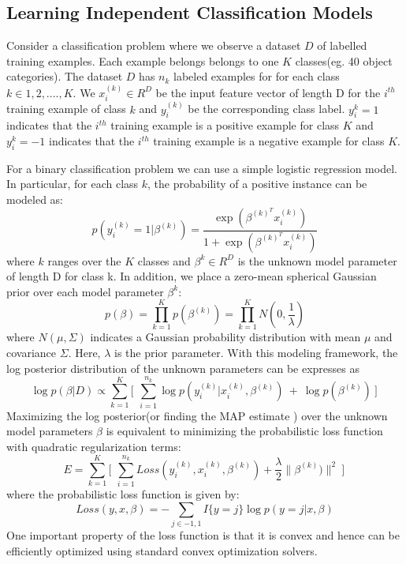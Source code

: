 \documentclass[10pt,twocolumn,letterpaper]{article}
\begin{document}
\subsection{Learning Independent Classification Models}

Consider a classification problem where we observe a dataset $D$ of labelled  training examples. 
Each example belongs belongs to one $K$ classes(eg. 40 object categories). The dataset $D$
has $n_{k}$ labeled examples for for each class $k  \in {1,2,....,K} $. We $x_{i}^{(k)} \in R^{D} $ 
be the input feature vector of length D for the $i^{th}$ training example of class $k$ and 
$y_{i}^{(k)}$ be the corresponding class label. $ y_{i}^{k} = 1 $ indicates that the $i^{th}$ training example 
 is a positive example for class $K$ and  $ y_{i}^{k} = -1 $ indicates that the $i^{th}$ training example 
 is a negative example for class $K$.
 
 For a binary classification problem we can use a simple logistic regression model. In particular, 
 for each class $k$, the probability of a positive instance can be modeled as: 
 \begin{equation}
 p(y_{i}^{(k)} = 1 | \beta^{(k)} )  = \frac { \exp( \beta^{(k)^{T}}  x_{i}^{(k)})  }{  1 + \exp(\beta^{(k)^{T}}  x_{i}^{(k)} ) } 
 \end{equation}
  where $k$ ranges over the $K$ classes and $ \beta^{k}  \in R^{D} $ is the unknown model parameter of length D 
  for class k. 
  In addition, we place a zero-mean spherical Gaussian prior over each model parameter  $  \beta^{k} $:
  \begin{equation}
	p(\beta)  = \prod_{k=1}^{K} p(\beta^{(k)}) = \prod_{k=1}^{K} N(0, \frac{1}{\lambda})
  \end{equation}
 where $N(\mu, \Sigma)$ indicates a Gaussian probability distribution with mean $\mu$ and covariance $\Sigma$.
 Here, $\lambda$ is the prior parameter.  With this modeling framework, the log posterior distribution of the unknown 
 parameters can be expresses as 
 \begin{equation}
	\log p(\beta | D) \propto \sum_{k=1}^{K} \Big[ \, \ \sum_{i=1}^{n_{k}} \log p(y_{i}^{(k)} | x_{i}^{(k)}, \beta^{(k)}) \ + \ \log p(\beta^{(k)}) \ \Big] \,
\end{equation}
 Maximizing the log posterior(or finding the MAP estimate ) over the unknown model parameters $\beta$  is  equivalent to 
 minimizing the probabilistic loss function with quadratic regularization terms:
 \begin{equation}
 	E = \sum_{k=1}^{K}  \Big[ \, \ \sum_{i=1}^{n_{k}} Loss(y_{i}^{(k)}, x_{i}^{(k)}, \beta^{(k)}) + \frac{\lambda}{2} \| \beta^{(k)}) \|^{2} \ \Big] \,
 \end{equation} 
 where the probabilistic loss function is given by:
 \begin{equation}
 Loss(y,  x,  \beta)  =  - \sum_{j \in {-1,1} } I\{y=j\} \log p(y=j | x,\beta)
\end{equation} 
One important property of the loss function is that it is convex and hence can be efficiently optimized
using standard convex optimization solvers.
 
\end{document}
